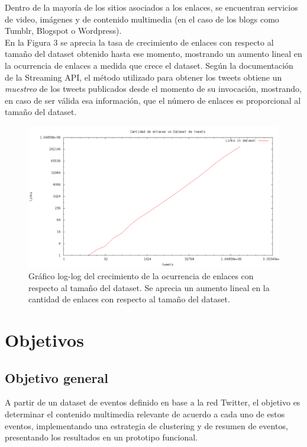 \documentclass[11pt]{article}
\begin{document}
   Dentro de la mayoría de los sitios asociados a los enlaces, se encuentran servicios de video, imágenes y de contenido multimedia (en el caso de los blogs como Tumblr, Blogspot o Wordpress).\\

   En la Figura 3 se aprecia la tasa de crecimiento de enlaces con respecto al tamaño del dataset obtenido hasta ese momento, mostrando un aumento lineal en la ocurrencia de enlaces a medida que crece el dataset. Según la documentación de la Streaming API, el método utilizado para obtener los tweets obtiene un \emph{muestreo} de los tweets publicados desde el momento de su invocación, mostrando, en caso de ser válida esa información, que el número de enlaces es proporcional al tamaño del dataset.\\

   \begin{figure}[htb]
\centering
\includegraphics[width=15cm]{./img/links.png}
\caption{Gráfico log-log del crecimiento de la ocurrencia de enlaces con respecto al tamaño del dataset. Se aprecia un aumento lineal en la cantidad de enlaces con respecto al tamaño del dataset.}
\end{figure}

\newpage
\section{Objetivos}
\label{sec-4}

\subsection{Objetivo general}
\label{sec-4.1}

   A partir de un dataset de eventos definido en base a la red Twitter, el objetivo es determinar el contenido multimedia relevante de acuerdo a cada uno de estos eventos, implementando una estrategia de clustering y de resumen de eventos, presentando los resultados en un prototipo funcional.
\end{document}
